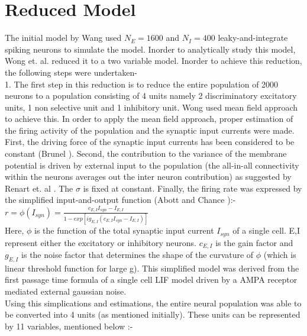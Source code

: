 \section*{Reduced Model}

The initial model by Wang\cite{wang2002probabilistic} used  $N_{E} = 1600$ and $N_{I} = 400$ leaky-and-integrate spiking neurons to simulate the model. Inorder to analytically study this model, Wong et. al. \cite{wong2006recurrent} reduced it to a two variable model. Inorder to achieve this reduction, the following steps were undertaken-\\

1. The first step in this reduction is to reduce the entire population of 2000 neurons to a population consisting of 4 units namely 2 discriminatory excitatory units, 1 non selective unit and 1 inhibitory unit. Wong used mean field approach to achieve this. In order to apply the mean field approach, proper estimation of the firing activity of the population and the synaptic input currents were made. First, the driving force of the synaptic input currents has been considered to be constant (Brunel \cite{brunel2000dynamics}). Second, the contribution to the variance of the membrane potential is driven by external input to the population (the all-in-all connectivity within the neurons averages out the inter neuron contribution) as suggested by Renart et. al \cite{renart2003mean}. The $\sigma$ is fixed at constant. Finally, the firing rate was expressed by the simplified input-and-output function (Abott and Chance \cite{abbott2005drivers}):-\\

\indent $r = \phi(I_{syn}) = \frac{c_{E,I} I_{syn} - I_{E,I}}{1 - exp[ig_{E,I}(c_{E,I}I_{syn} - I_{E,I})]}$\\

Here, $\phi$ is the function of the total synaptic input current $I_{syn}$ of a single cell. E,I represent either the excitatory or inhibitory neurons. $c_{E,I}$ is the gain factor and $g_{E,I}$ is the noise factor that determines the shape of the curvature of $\phi$ (which is linear threshold function for large g). This simplified model was derived from the first passage time formula of a single cell LIF model driven by a AMPA receptor mediated external gaussian noise. \\

Using this simplications and estimations, the entire neural population was able to be converted into 4 units (as mentioned initially). These units can be represented by 11 variables, mentioned below :-\\

